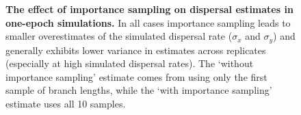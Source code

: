 \documentclass[12pt]{article}
\begin{document}
\begin{figure}[!htb]

\begin{center}


\end{center}

\caption{
\textbf{The effect of importance sampling on dispersal estimates in one-epoch simulations.}
In all cases importance sampling leads to smaller overestimates of the simulated dispersal rate ($\sigma_x$ and $\sigma_y$) and generally exhibits lower variance in estimates across replicates (especially at high simulated dispersal rates).
The `without importance sampling' estimate comes from using only the first sample of branch lengths, while the `with importance sampling' estimate uses all 10 samples. 
}

\label{fig:sup_sigma_imp}
\end{figure}
\end{document}
